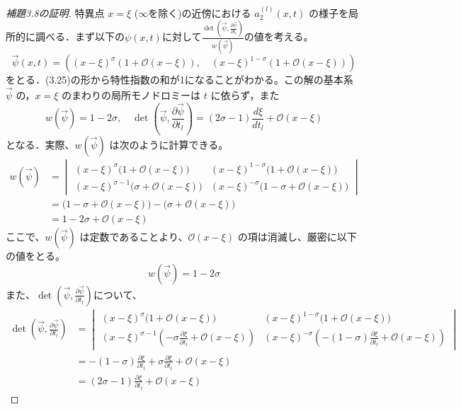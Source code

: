 \documentclass[paper=a4, fontsize=11pt]{jlreq} %
\newenvironment{story}{%
  \begin{mdframed}[
    backgroundcolor=red!5, %
    linewidth=0pt,         %
    innertopmargin=10pt,   %
    innerbottommargin=10pt,
    innerrightmargin=10pt, %
    innerleftmargin=10pt
  ]%
}{%
  \end{mdframed}%
}
\theoremstyle{break}
\theoremstyle{qa}
\begin{document}
\begin{story}
\begin{proof}[補題3.8の証明]
特異点 $x=\xi$ ($\infty$を除く)の近傍における $a_2^{(l)}(x,t)$ の様子を局所的に調べる．まず以下の$\psi(x,t)$に対して$\frac{\det \left( \vec{\psi}, \frac{\partial\vec{\psi}}{\partial t_l}\right)}{w(\vec{\psi})}$の値を考える。
\begin{equation*}
    \vec{\psi}(x,t) = \left( (x-\xi)^\sigma(1+\mathcal{O}(x-\xi)), \quad (x-\xi)^{1-\sigma}(1+\mathcal{O}(x-\xi)) \right)
\end{equation*}
をとる．(3.25)の形から特性指数の和が1になることがわかる。この解の基本系 $\vec{\psi}$ の，$x=\xi$ のまわりの局所モノドロミーは $t$ に依らず，また
\begin{equation*}
    w(\vec{\psi}) = 1-2\sigma, \quad \det \left( \vec{\psi}, \frac{\partial \vec{\psi}}{\partial t_l} \right) = (2\sigma - 1)\frac{d\xi}{dt_l} + \mathcal{O}(x-\xi)
\end{equation*}
となる．実際、$w(\vec{\psi})$ は次のように計算できる。
\begin{align*}
    w(\vec{\psi}) &= 
    \begin{vmatrix}
        (x-\xi)^\sigma \big(1 + \mathcal{O}(x-\xi)\big) & (x-\xi)^{1-\sigma} \big(1 + \mathcal{O}(x-\xi)\big) \\[6pt]
        (x-\xi)^{\sigma-1} \big(\sigma + \mathcal{O}(x-\xi)\big) & (x-\xi)^{-\sigma} \big(1-\sigma + \mathcal{O}(x-\xi)\big)
    \end{vmatrix} \\[8pt]
    &= \big(1 - \sigma + \mathcal{O}(x-\xi)\big) - \big(\sigma + \mathcal{O}(x-\xi)\big) \\[4pt]
    &= 1 - 2\sigma + \mathcal{O}(x-\xi)
\end{align*}
ここで、$w(\vec{\psi})$ は定数であることより、$\mathcal{O}(x-\xi)$ の項は消滅し、厳密に以下の値をとる。
\begin{equation}
    w(\vec{\psi}) = 1 - 2\sigma
\end{equation}
また、$\det\left(\vec{\psi}, \frac{\partial \vec{\psi}}{\partial t_l}\right)$について、
\begin{align*}
    \det\left(\vec{\psi}, \frac{\partial \vec{\psi}}{\partial t_l}\right) &= 
    \begin{vmatrix}
        (x-\xi)^\sigma \big(1 + \mathcal{O}(x-\xi)\big) & (x-\xi)^{1-\sigma} \big(1 + \mathcal{O}(x-\xi)\big) \\[6pt]
        (x-\xi)^{\sigma-1} \left(-\sigma \frac{\partial \xi}{\partial t_l} + \mathcal{O}(x-\xi)\right) & (x-\xi)^{-\sigma} \left(-(1-\sigma) \frac{\partial \xi}{\partial t_l} + \mathcal{O}(x-\xi)\right)
    \end{vmatrix} \\[8pt]
    &= -(1-\sigma) \frac{\partial \xi}{\partial t_l} + \sigma \frac{\partial \xi}{\partial t_l} + \mathcal{O}(x-\xi) \\[4pt]
    &= (2\sigma - 1) \frac{\partial \xi}{\partial t_l} + \mathcal{O}(x-\xi)
\end{align*}


\end{proof}
\end{story}
\end{document}
